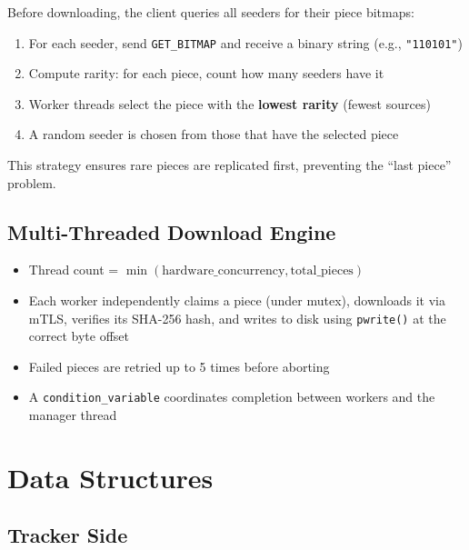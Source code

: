 \documentclass[12pt,a4paper]{article}
\begin{document}
Before downloading, the client queries all seeders for their piece bitmaps:

\begin{enumerate}
    \item For each seeder, send \texttt{GET\_BITMAP} and receive a binary string (e.g., \texttt{"110101"})
    \item Compute rarity: for each piece, count how many seeders have it
    \item Worker threads select the piece with the \textbf{lowest rarity} (fewest sources)
    \item A random seeder is chosen from those that have the selected piece
\end{enumerate}

This strategy ensures rare pieces are replicated first, preventing the ``last piece'' problem.

\subsection{Multi-Threaded Download Engine}

\begin{itemize}
    \item Thread count = $\min(\text{hardware\_concurrency}, \text{total\_pieces})$
    \item Each worker independently claims a piece (under mutex), downloads it via mTLS, verifies its SHA-256 hash, and writes to disk using \texttt{pwrite()} at the correct byte offset
    \item Failed pieces are retried up to 5 times before aborting
    \item A \texttt{condition\_variable} coordinates completion between workers and the manager thread
\end{itemize}

\section{Data Structures}

\subsection{Tracker Side}
\end{document}
